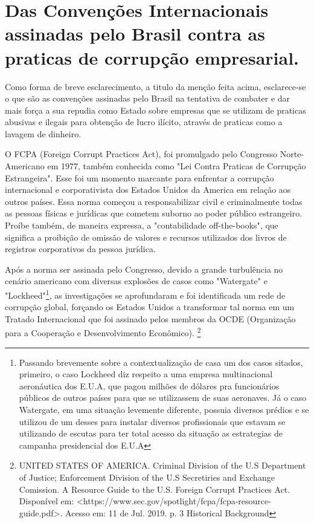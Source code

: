 \section{Das Convenções Internacionais assinadas pelo Brasil contra as praticas de corrupção empresarial.}

Como forma de breve esclarecimento, a titulo da menção feita acima, esclarece-se o que são as convenções assinadas pelo Brasil na tentativa de combater e dar mais força a sua repudia como Estado sobre empresas que se utilizam de praticas abusivas e ilegais para obtenção de lucro ilícito, através de praticas como a lavagem de dinheiro. 

O FCPA (Foreign Corrupt Practices Act), foi promulgado pelo Congresso Norte-Americano em 1977, também conhecida como "Lei Contra Praticas de Corrupção Estrangeira". Esse foi um momento marcante para enfrentar a corrupção internacional e corporativista dos Estados Unidos da America em relação aos outros países. Essa norma começou a responsabilizar civil e criminalmente todas as pessoas físicas e jurídicas que cometem suborno ao poder público estrangeiro. Proíbe também, de maneira expressa, a "contabilidade off-the-books", que significa a proibição de omissão de valores e recursos utilizados dos livros de registros corporativos da pessoa jurídica.

Após a norma ser assinada pelo Congresso, devido a grande turbulência no cenário americano com diversas explosões de casos como "Watergate" e "Lockheed"\footnote{Passando brevemente sobre a contextualização de casa um dos casos sitados, primeiro, o caso Lockheed diz respeito a uma empresa multinacional aeronáutica dos E.U.A, que pagou milhões de dólares pra funcionários públicos de outros países para que se utilizassem de suas aeronaves. Já o caso Watergate, em uma situação levemente diferente, possuia diversos prédios e se utilizou de um desses para instalar diversos profissionais que estavam se utilizando de escutas para ter total acesso da situação as estrategias de campanha presidencial dos E.U.A}, as investigações se aprofundaram e foi identificada um rede de corrupção global, forçando os Estados Unidos a transformar tal norma em um Tratado Internacional que foi assinado pelos membros da OCDE (Organização para a Cooperação e Desenvolvimento Econômico)\cite{CriminalDivisionofUS}. \footnote{UNITED STATES OF AMERICA. Criminal Division of the U.S Department of Justice; Enforcement Division of the U.S Secretiries and Exchange Comission. A Resource Guide to the U.S. Foreign Corrupt Practices Act. Disponível em: <https://www.sec.gov/spotlight/fcpa/fcpa-resource-guide.pdf>. Acesso em: 11 de Jul. 2019. p. 3 Historical Background} 

